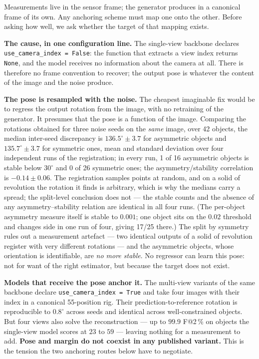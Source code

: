 \documentclass[conference]{IEEEtran}
\makeatletter
\newcommand{\Fs}{F@2\,\%}
\makeatother
\begin{document}
Measurements live in the sensor frame; the generator produces in a canonical frame of
its own. Any anchoring scheme must map one onto the other. Before asking how well, we
ask whether the target of that mapping exists.

\textbf{The cause, in one configuration line.} The single-view backbone declares
\texttt{use\_camera\_index = False}: the function that extracts a view index returns
\texttt{None}, and the model receives no information about the camera at all. There is
therefore no frame convention to recover; the output pose is whatever the content of
the image and the noise produce.

\textbf{The pose is resampled with the noise.} The cheapest imaginable fix would be to
regress the output rotation from the image, with no retraining of the generator. It
presumes that the pose is a function of the image. Comparing the rotations obtained for
three noise seeds on the \emph{same} image, over 42 objects, the median inter-seed
discrepancy is $136.5^\circ \pm 3.7$ for asymmetric objects and $135.7^\circ \pm
3.7$ for symmetric ones, mean and standard deviation over four independent runs of the
registration; in every run, 1 of 16 asymmetric objects is stable below $30^\circ$ and
0 of 26 symmetric ones; the asymmetry/stability correlation is $-0.14 \pm 0.06$. The
registration samples points at random, and on a solid of revolution the rotation it
finds is arbitrary, which is why the medians carry a spread; the split-level
conclusion does not --- the stable counts and the absence of any asymmetry--stability
relation are identical in all four runs. (The per-object asymmetry measure itself is
stable to $0.001$; one object sits on the $0.02$ threshold and changes side in one run
of four, giving 17/25 there.) The split by symmetry rules out a
measurement artefact --- two identical outputs of a solid of revolution register with
very different rotations --- and the asymmetric objects, whose orientation is
identifiable, are \emph{no more stable}. No regressor can learn this pose: not for
want of the right estimator, but because the target does not exist.

\textbf{Models that receive the pose anchor it.} The multi-view variants of the same
backbone declare \texttt{use\_camera\_index = True} and take four images with their
index in a canonical 55-position rig. Their prediction-to-reference rotation is
reproducible to $0.8^\circ$ across seeds and identical across well-constrained objects.
But four views also solve the reconstruction --- up to $99.9$ \Fs{} on objects the
single-view model scores at $23$ to $59$ --- leaving nothing for a measurement to add.
\textbf{Pose and margin do not coexist in any published variant.} This is the tension
the two anchoring routes below have to negotiate.
\end{document}
